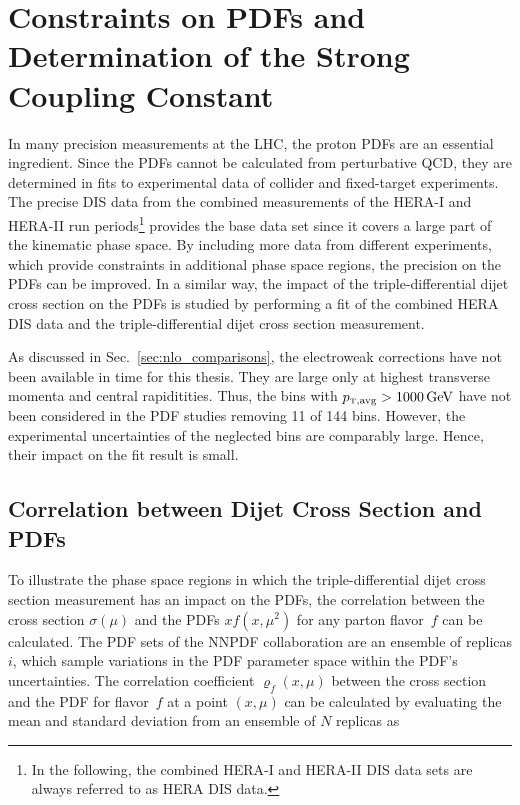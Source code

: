 
\chapter{Constraints on PDFs and Determination of the Strong Coupling Constant}
\label{sec:pdf_constraints}

In many precision measurements at the LHC, the proton PDFs are an essential
ingredient. Since the PDFs cannot be calculated from perturbative QCD, they are
determined in fits to experimental data of collider and fixed-target experiments.
The precise DIS data from the combined measurements of the HERA-I and HERA-II
run periods\footnote{In the following, the combined HERA-I and HERA-II DIS data sets
are always referred to as HERA DIS data.} provides the base data set since it
covers a large part of the kinematic phase space. By including more data from different
experiments, which provide constraints in additional phase space regions, the
precision on the PDFs can be improved. In a similar way, the impact of the
triple-differential dijet cross section on the PDFs is studied by performing a
fit of the combined HERA DIS data and the triple-differential dijet cross
section measurement.

As discussed in Sec.~\ref{sec:nlo_comparisons}, the electroweak corrections have
not been available in time for this thesis. They are large only at highest
transverse momenta and central rapiditities. Thus, the bins with $\ptavg >
\SI{1000}{\GeV}$ have not been considered in the PDF studies removing 11 of 144
bins. However, the experimental uncertainties of the neglected bins are
comparably large. Hence, their impact on the fit result is small.

\section{Correlation between Dijet Cross Section and PDFs}
\label{sec:pdf_sensitivity}

To illustrate the phase space regions in which the triple-differential dijet
cross section measurement has an impact on the PDFs, the correlation between the cross
section $\sigma(\mu)$ and the PDFs $xf(x,\mu^2)$ for any parton flavor~$f$ can be
calculated. The PDF sets of the NNPDF collaboration are an ensemble of replicas
$i$, which sample variations in the PDF parameter space within the PDF's
uncertainties. The correlation coefficient $\varrho_f(x,\mu)$ between the cross
section and the PDF for flavor~$f$ at a point $(x,\mu)$ can be calculated by
evaluating the mean and standard deviation from an ensemble of $N$ replicas as

